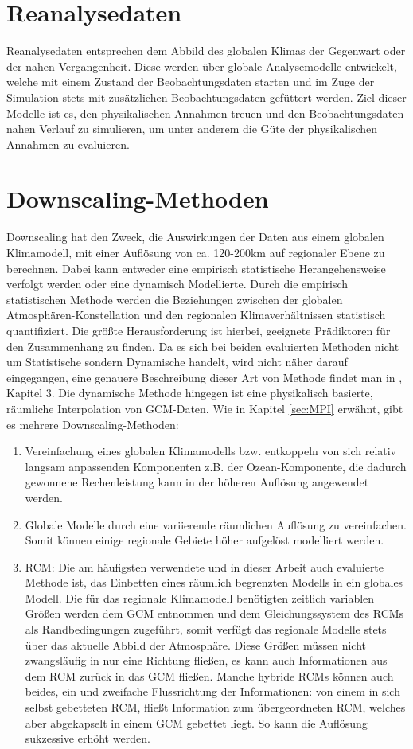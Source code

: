 \section{Reanalysedaten}
Reanalysedaten entsprechen dem Abbild des globalen Klimas der Gegenwart oder der nahen Vergangenheit. Diese werden über globale Analysemodelle entwickelt, welche mit einem Zustand der Beobachtungsdaten starten und im Zuge der Simulation stets mit zusätzlichen Beobachtungsdaten gefüttert werden. Ziel dieser Modelle ist es, den physikalischen Annahmen treuen und den Beobachtungsdaten nahen Verlauf zu simulieren, um unter anderem die Güte der physikalischen Annahmen zu evaluieren.
\section{Downscaling-Methoden}
Downscaling hat den Zweck, die Auswirkungen der Daten aus einem globalen Klimamodell, mit einer Auflösung von ca. 120-200km auf regionaler Ebene zu berechnen. Dabei kann entweder eine empirisch statistische Herangehensweise verfolgt werden oder eine dynamisch Modellierte. Durch die empirisch statistischen Methode werden die Beziehungen zwischen der globalen Atmosphären-Konstellation und den regionalen Klimaverhältnissen statistisch quantifiziert. Die größte Herausforderung ist hierbei, geeignete Prädiktoren für den Zusammenhang zu finden. Da es sich bei beiden evaluierten Methoden nicht um Statistische sondern Dynamische handelt, wird nicht näher darauf eingegangen, eine genauere Beschreibung dieser Art von Methode findet man in \cite{RCM}, Kapitel 3. Die dynamische Methode hingegen ist eine
physikalisch basierte, räumliche Interpolation von GCM-Daten. Wie in Kapitel \ref{sec:MPI} erwähnt, gibt es mehrere Downscaling-Methoden:
\begin{enumerate}[label=(\alph*)]
	\item Vereinfachung eines globalen Klimamodells bzw. entkoppeln von sich relativ langsam anpassenden Komponenten z.B. der Ozean-Komponente, die dadurch gewonnene Rechenleistung kann in der höheren Auflösung angewendet werden.
	\item Globale Modelle durch eine variierende räumlichen Auflösung zu vereinfachen. Somit können einige regionale Gebiete höher aufgelöst modelliert werden.
	\item RCM: Die am häufigsten verwendete und in dieser Arbeit auch evaluierte Methode ist, das Einbetten eines räumlich begrenzten Modells in ein globales Modell. Die für das regionale Klimamodell benötigten zeitlich variablen Größen werden dem GCM entnommen und dem Gleichungssystem des RCMs als Randbedingungen zugeführt, somit verfügt das regionale Modelle stets über das aktuelle Abbild der Atmosphäre. Diese Größen müssen nicht zwangsläufig in nur eine Richtung fließen, es kann auch Informationen aus dem RCM zurück in das GCM fließen. Manche hybride RCMs können auch beides, ein und zweifache Flussrichtung der Informationen: von einem in sich selbst gebetteten RCM, fließt Information zum übergeordneten RCM, welches aber abgekapselt in einem GCM gebettet liegt. So kann die Auflösung sukzessive erhöht werden. 
\end{enumerate}
